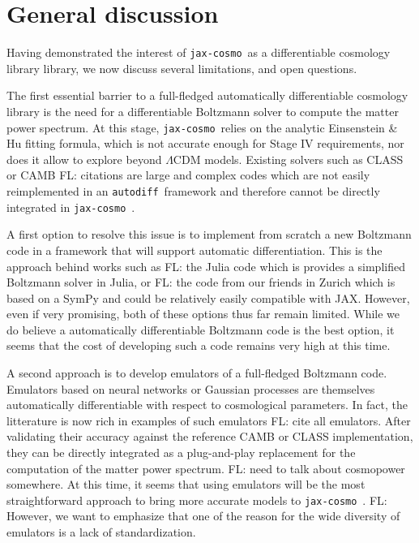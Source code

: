 \documentclass[twocolumn,twocolappendix,nofootinbib,iop]{openjournal}
\newcommand{\FrL}[1]{{\color{cyan}FL: #1}}
\newcommand{\jaxcosmo}{\texttt{jax-cosmo}}
\newcommand{\autodiff}{\texttt{autodiff}}
\begin{document}
\section{General discussion}
\label{sec-discussion}
%
Having demonstrated the interest of \jaxcosmo\ as a differentiable cosmology library library, we now discuss several limitations, and open questions.

The first essential barrier to a full-fledged automatically differentiable cosmology library is the need for a differentiable Boltzmann solver to compute the matter power spectrum. At this stage, \jaxcosmo\ relies on the analytic Einsenstein \& Hu fitting formula, which is not accurate enough for Stage IV requirements, nor does it allow to explore beyond $\Lambda$CDM models. Existing solvers such as CLASS or CAMB \FrL{citations} are large and complex codes which are not easily reimplemented in an \autodiff\ framework and therefore cannot be directly integrated in \jaxcosmo\ . 

A first option to resolve this issue is to implement from scratch a new Boltzmann code in a framework that will support automatic differentiation. This is the approach behind works such as \FrL{the Julia code} which is provides a simplified Boltzmann solver in Julia, or \FrL{the code from our friends in Zurich} which is based on a SymPy and could be relatively easily compatible with JAX. However, even if very promising, both of these options thus far remain limited. While we do believe a automatically differentiable Boltzmann code is the best option, it seems that the cost of developing such a code remains very high at this time.

A second approach is to develop emulators of a full-fledged Boltzmann code. Emulators based on neural networks or Gaussian processes are themselves automatically differentiable with respect to cosmological parameters. In fact, the litterature is now rich in examples of such emulators \FrL{cite all emulators}. After validating their accuracy against the reference CAMB or CLASS implementation, they can be directly integrated as a plug-and-play replacement for the computation of the matter power spectrum. \FrL{need to talk about cosmopower somewhere.} At this time, it seems that using emulators will be the most straightforward approach to bring more accurate models to \jaxcosmo\ . \FrL{However, we want to emphasize that one of the reason for the wide diversity of emulators is a lack of standardization}.
\end{document}
